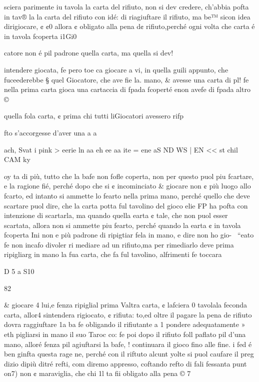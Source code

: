 \documentclass[12pt,a6paper]{article}
\begin{document}
sciera parimente iu tavola la
carta del rifiuto, non si dev
credere, ch’abbia pofta in tav®
la la carta del rifiuto con idé:
di riagiuftare il rifiuto, ma be™
sicon idea dirigiocare, ¢ ¢0%
allora ¢ obligato alla pena d¢
rifiuto,perché ogni volta che
carta é in tavola fcoperta i1Gi0

catore non é pil padrone
quella carta, ma quella si dev!

intendere giocata, fe pero toe
ca giocare a vi, in quella guili
appunto, che fuceederebbe §
quel Giocatore, che ave fie la.
mano, & avesse una carta di pl!
fe nella prima carta gioca
una cartaccia di fpada fcoperté
enon avefe di fpada altro ©

quella fola carta, ¢ prima chi
tutti liGiocatori avessero rifp

fto s’accorgesse d’aver una a
a

 
 

ach, Svat i pink > eerie ln aa eh ee aa ite = ene aS ND WS | EN << st chil CAM ky

oy
ta di più, tutto che la bafe non
fofle coperta, non per questo
puol piu fcartare, e la ragione
fié, perché dopo che si ¢ incominciato & giocare non ¢ più
luogo allo fcarto, ed intanto si
ammette lo fearto nella prima
mano, perché quello che deve
scartare puol dire, che la carta
potta ful tavolino del gioco elie
FP ha pofta con intenzione di
scartarla, ma quando quella
earta ¢ tale, che non puol esser
scartata, allora non si ammette
piu fearto, perché quando la
earta ¢ in tavola fcoperta Ini
non e più padrone di ripigtiar
fela in mano, e dire non ho gio-~
“eato fe non incafo divoler ri
mediare ad un rifiuto,ma per rimediarlo deve prima ripigliarg
in mano la fua carta, che fa ful
tavolino, alfrimenti fe toccara

D 5 a S10

 

 

 
 

 

 

 

 

82

& giocare 4 lui,e fenza ripiglial
prima Valtra carta, ¢ lafciera 0
tavolala feconda carta, allor4
sintendera rigiocato, ¢ rifiuta:
to,ed oltre il pagare la pena de
rifiuto dovra raggiuftare 1a ba
fe obligando il rifiutante a 1%
pondere adequatamente » eth
pigliarsi in mano il suo Taroc
co: fe poi dopo il rifiuto foll
paflato pil d’una mano, alloré
fenza pil agiuftarsi la bafe, !
continuara il gioco fino alle
fine. i
fed é ben ginfta questa rage
ne, perché con il riftuto alcunt
yolte si puol caufare il preg
dizio dipiù ditré refti, com
diremo appresso, coftando
refto di fali fessanta punt on7)
non ¢ maraviglia, che chi 1l
ta fii obligato alla pena © 7
\end{document}
